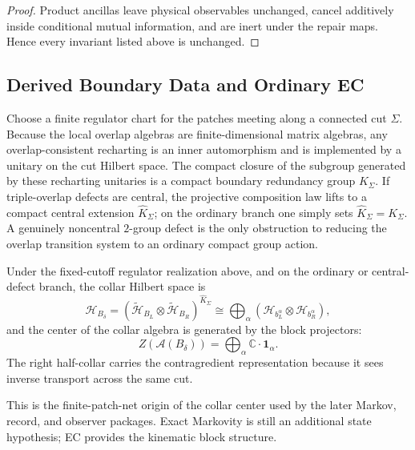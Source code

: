 \begin{proof}
Product ancillas leave physical observables unchanged, cancel additively inside conditional mutual
information, and are inert under the repair maps. Hence every invariant listed above is unchanged.
\end{proof}

\subsection{Derived Boundary Data and Ordinary EC}

\begin{proposition}
Choose a finite regulator chart for the patches meeting along a connected cut \(\Sigma\). Because
the local overlap algebras are finite-dimensional matrix algebras, any overlap-consistent
recharting is an inner automorphism and is implemented by a unitary on the cut Hilbert space. The
compact closure of the subgroup generated by these recharting unitaries is a compact boundary
redundancy group \(K_\Sigma\). If triple-overlap defects are central, the projective composition
law lifts to a compact central extension \(\widehat K_\Sigma\); on the ordinary branch one simply
sets \(\widehat K_\Sigma = K_\Sigma\). A genuinely noncentral \(2\)-group defect is the only
obstruction to reducing the overlap transition system to an ordinary compact group action.
\end{proposition}

\begin{theorem}
Under the fixed-cutoff regulator realization above, and on the ordinary or central-defect branch,
the collar Hilbert space is
\[
\mathcal H_{B_\delta}
=
(\tilde{\mathcal H}_{B_L}\otimes \tilde{\mathcal H}_{B_R})^{\widehat K_\Sigma}
\cong
\bigoplus_{\alpha}
\left(\mathcal H_{b_L^\alpha}\otimes \mathcal H_{b_R^\alpha}\right),
\]
and the center of the collar algebra is generated by the block projectors:
\[
Z(\mathcal A(B_\delta))
=
\bigoplus_\alpha \mathbb C\cdot \mathbf 1_\alpha.
\]
The right half-collar carries the contragredient representation because it sees inverse transport
across the same cut.
\end{theorem}

\begin{remark}
This is the finite-patch-net origin of the collar center used by the later Markov, record, and
observer packages. Exact Markovity is still an additional state hypothesis; EC provides the
kinematic block structure.
\end{remark}

